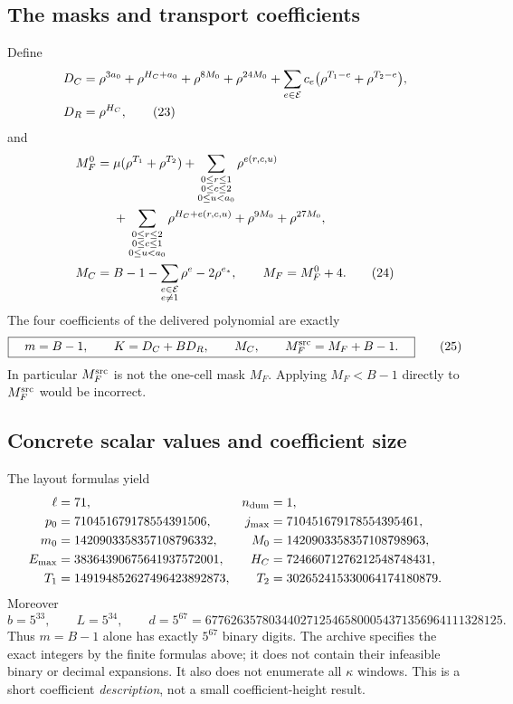 \documentclass[11pt,a4paper]{article}
\theoremstyle{definition}
\theoremstyle{remark}
\begin{document}
\subsection{The masks and transport coefficients}
Define
\begin{align}
 D_C={}&\rho^{3a_0}+\rho^{H_C+a_0}
          +\rho^{8M_0}+\rho^{24M_0}
          +\sum_{e\in\mathcal E}c_e
              \bigl(\rho^{T_1-e}+\rho^{T_2-e}\bigr),\notag\\
 D_R={}&\rho^{H_C}, \tag{23}\label{eq:DC}
\end{align}
and
\begin{align}
 M_F^0={}&\mu(\rho^{T_1}+\rho^{T_2})
  +\sum_{\substack{0\le r\le1\\0\le c\le2\\0\le u<a_0}}
                    \rho^{e(r,c,u)}\notag\\
 &+\sum_{\substack{0\le r\le2\\0\le c\le1\\0\le u<a_0}}
                    \rho^{H_C+e(r,c,u)}
  +\rho^{9M_0}+\rho^{27M_0},\notag\\
 M_C={}&B-1-\sum_{\substack{e\in\mathcal E\\e\ne1}}\rho^e
                     -2\rho^{e_*},\qquad
 M_F=M_F^0+4. \tag{24}\label{eq:masks}
\end{align}
The four coefficients of the delivered polynomial are exactly
\[
 \boxed{\quad m=B-1,\qquad K=D_C+BD_R,\qquad
             M_C,\qquad M_F^{\rm src}=M_F+B-1.\quad} \tag{25}
\]
In particular \(M_F^{\rm src}\) is not the one-cell mask \(M_F\).
Applying \(M_F<B-1\) directly to \(M_F^{\rm src}\) would be incorrect.

\subsection{Concrete scalar values and coefficient size}
The layout formulas yield
\begin{align*}
 \ell&=71,&n_{\rm dum}&=1,\\
 p_0&=710451679178554391506,&
 j_{\max}&=710451679178554395461,\\
 m_0&=1420903358357108796332,&
 M_0&=1420903358357108798963,\\
 E_{\max}&=38364390675641937572001,&
 H_C&=72466071276212548748431,\\
 T_1&=149194852627496423892873,&
 T_2&=302652415330064174180879.
\end{align*}
Moreover
\[
 b=5^{33},\qquad L=5^{34},\qquad
 d=5^{67}
 =67762635780344027125465800054371356964111328125.
 \tag{26}
\]
Thus \(m=B-1\) alone has exactly \(5^{67}\) binary digits.
The archive specifies the exact integers by the finite formulas above;
it does not contain their infeasible binary or decimal expansions.
It also does not enumerate all \(\kappa\) windows. This is a short
coefficient \emph{description}, not a small coefficient-height result.
\end{document}
